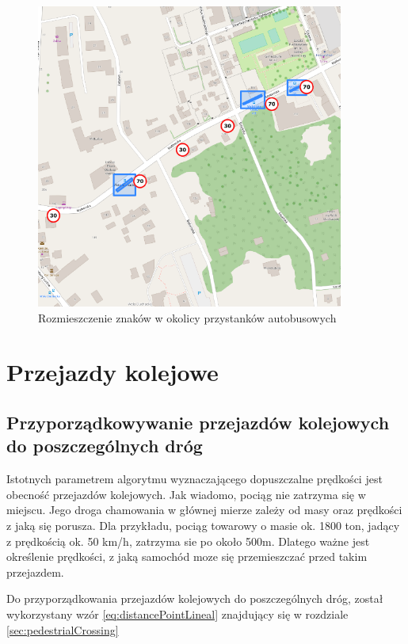 \begin{figure}[h]
\caption{Rozmieszczenie znaków w okolicy przystanków autobusowych}
\label{sec:busStopSpeed}
\centering
\includegraphics[width=0.9\textwidth]{busStopSpeed}
\end{figure}

\newpage
\section{Przejazdy kolejowe}
\label{sec:railCrossingMain}
\subsection{Przyporządkowywanie przejazdów kolejowych do poszczególnych dróg}

Istotnych parametrem algorytmu wyznaczającego dopuszczalne prędkości jest obecność przejazdów kolejowych. Jak wiadomo, pociąg nie zatrzyma się w miejscu. Jego droga chamowania w głównej mierze zależy od masy oraz prędkości z jaką się porusza. Dla przykładu, pociąg towarowy o masie ok. 1800 ton, jadący z prędkością ok. 50 km/h, zatrzyma sie po około 500m. Dlatego ważne jest określenie prędkości, z jaką samochód moze się przemieszczać przed takim przejazdem.

Do przyporządkowania przejazdów kolejowych do poszczególnych dróg, został wykorzystany wzór \ref{eq:distancePointLineal} znajdujący się w rozdziale \ref{sec:pedestrialCrossing}


